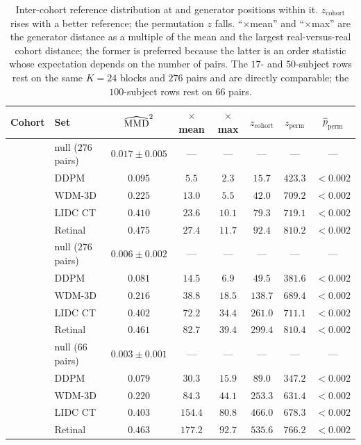 \begin{table}[t]
\centering
\caption{Inter-cohort reference distribution at  and generator positions
within it. $z_{\mathrm{cohort}}$ rises with a better reference; the permutation
$z$ falls. ``$\times$mean'' and ``$\times$max'' are the generator distance as a
multiple of the mean and the largest real-versus-real cohort distance; the
former is preferred because the latter is an order statistic whose expectation
depends on the number of pairs. The $17$- and $50$-subject rows rest on the
same $K = 24$ blocks and $276$ pairs and are directly comparable; the
$100$-subject rows rest on $66$ pairs.}
\label{tab:cohortnull}
\small
\begin{tabular}{llcccccc}
\toprule
Cohort & Set & $\widehat{\mathrm{MMD}}^2$ & $\times$mean & $\times$max
 & $z_{\mathrm{cohort}}$ & $z_{\mathrm{perm}}$ & $\hat{p}_{\mathrm{perm}}$ \\
\midrule
{}
 & null ($276$ pairs) & $0.017 \pm 0.005$ & --- & --- & --- & --- & --- \\
 & DDPM      & $0.095$ & $5.5$  & $2.3$  & $15.7$ & $423.3$ & $<0.002$ \\
 & WDM-3D    & $0.225$ & $13.0$ & $5.5$  & $42.0$ & $709.2$ & $<0.002$ \\
 & LIDC CT   & $0.410$ & $23.6$ & $10.1$ & $79.3$ & $719.1$ & $<0.002$ \\
 & Retinal   & $0.475$ & $27.4$ & $11.7$ & $92.4$ & $810.2$ & $<0.002$ \\
\midrule
{}
 & null ($276$ pairs) & $0.006 \pm 0.002$ & --- & --- & --- & --- & --- \\
 & DDPM      & $0.081$ & $14.5$ & $6.9$  & $49.5$  & $381.6$ & $<0.002$ \\
 & WDM-3D    & $0.216$ & $38.8$ & $18.5$ & $138.7$ & $689.4$ & $<0.002$ \\
 & LIDC CT   & $0.402$ & $72.2$ & $34.4$ & $261.0$ & $711.1$ & $<0.002$ \\
 & Retinal   & $0.461$ & $82.7$ & $39.4$ & $299.4$ & $810.4$ & $<0.002$ \\
\midrule
{}
 & null ($66$ pairs) & $0.003 \pm 0.001$ & --- & --- & --- & --- & --- \\
 & DDPM      & $0.079$ & $30.3$  & $15.9$ & $89.0$  & $347.2$ & $<0.002$ \\
 & WDM-3D    & $0.220$ & $84.3$  & $44.1$ & $253.3$ & $631.4$ & $<0.002$ \\
 & LIDC CT   & $0.403$ & $154.4$ & $80.8$ & $466.0$ & $678.3$ & $<0.002$ \\
 & Retinal   & $0.463$ & $177.2$ & $92.7$ & $535.6$ & $766.2$ & $<0.002$ \\
\bottomrule
\end{tabular}
\end{table}

